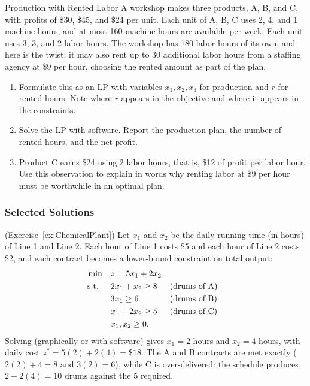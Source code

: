 
\begin{ex}{Production with Rented Labor}{}
\label{ex:rented-labor}
 A workshop makes three products, A, B, and C, with profits of \$30, \$45, and \$24 per unit. Each unit of A, B, C uses 2, 4, and 1 machine-hours, and at most 160 machine-hours are available per week. Each unit uses 3, 3, and 2 labor hours. The workshop has 180 labor hours of its own, and here is the twist: it may also rent up to 30 additional labor hours from a staffing agency at \$9 per hour, choosing the rented amount as part of the plan.
\begin{enumerate}
\item Formulate this as an LP with variables $x_1, x_2, x_3$ for production and $r$ for rented hours. Note where $r$ appears in the objective and where it appears in the constraints.
\item Solve the LP with software. Report the production plan, the number of rented hours, and the net profit.
\item Product C earns \$24 using 2 labor hours, that is, \$12 of profit per labor hour. Use this observation to explain in words why renting labor at \$9 per hour must be worthwhile in an optimal plan.
\end{enumerate}
\end{ex}

\subsubsection*{Selected Solutions}

\begin{solution}(Exercise~\ref{ex:ChemicalPlant})
Let $x_1$ and $x_2$ be the daily running time (in hours) of Line 1 and Line 2.  Each hour of Line 1 costs \$5 and each hour of Line 2 costs \$2, and each contract becomes a lower-bound constraint on total output:
\begin{align*}
\min \quad & z = 5x_1 + 2x_2\\
\mbox{ s.t. } \quad & 2x_1 + x_2 \geq 8 && \mbox{(drums of A)}\\
& 3x_1 \geq 6 && \mbox{(drums of B)}\\
& x_1 + 2x_2 \geq 5 && \mbox{(drums of C)}\\
& x_1, x_2 \geq 0.
\end{align*}
Solving (graphically or with software) gives $x_1 = 2$ hours and $x_2 = 4$ hours, with daily cost $z^* = 5(2) + 2(4) = \$18$.  The A and B contracts are met exactly ($2(2)+4 = 8$ and $3(2) = 6$), while C is over-delivered: the schedule produces $2 + 2(4) = 10$ drums against the $5$ required.
\end{solution}

